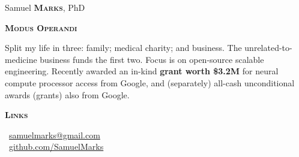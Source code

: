 \documentclass[11pt, a4paper]{article}
\newcommand{\headleft}[1]{\vspace*{3ex}\textsc{\textbf{#1}}\par%
    \vspace*{-1.5ex}\hrulefill\par\vspace*{0.7ex}}
\begin{document}
\setlength{\topskip}{0pt}
\setlength{\parindent}{0pt}
\setlength{\parskip}{0pt}
\setlength{\fboxsep}{0pt}
\pagestyle{empty}
\raggedbottom

\begin{minipage}[t]{0.33\textwidth} %
\colorbox{cvblue}{\begin{minipage}[t][5mm][t]{\textwidth}\null\hfill\null\end{minipage}}

\vspace{-.2ex} %
\colorbox{cvblue!90}{\color{white}  %
\textwidth\relax%
\begin{minipage}[t][293mm][t]{0.82\textwidth}
\raggedright
\vspace*{2.5ex}

\Large Samuel \textbf{\textsc{Marks}}, PhD \normalsize


\vspace*{0.5ex} %

\headleft{Modus Operandi}
Split my life in three: family; medical charity; and business. The unrelated-to-medicine business funds the first two. Focus is on open-source scalable engineering. Recently awarded an in-kind \textbf{grant worth \$3.2M} for neural compute processor access from Google, and (separately) all-cash unconditional awards (grants) also from Google.

\headleft{Links}
\small %
\MVAt\ \href{mailto://samuelmarks@gmail.com}{\small samuelmarks@gmail.com} \\[0.4ex]
\Mundus\ \href{https://github.com/SamuelMarks}{github.com/SamuelMarks} \\[0.1ex]
\normalsize


\end{minipage}}
\end{minipage}
\end{document}
